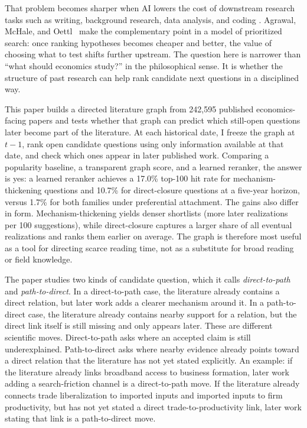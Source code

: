 \documentclass[11pt]{article}
\begin{document}
That problem becomes sharper when AI lowers the cost of downstream research tasks such as writing, background research, data analysis, and coding \citep{korinek2024generative}. Agrawal, McHale, and Oettl~\citeyearpar{agrawal2024ai} make the complementary point in a model of prioritized search: once ranking hypotheses becomes cheaper and better, the value of choosing what to test shifts further upstream. The question here is narrower than ``what should economics study?'' in the philosophical sense. It is whether the structure of past research can help rank candidate next questions in a disciplined way.

This paper builds a directed literature graph from 242{,}595 published economics-facing papers and tests whether that graph can predict which still-open questions later become part of the literature. At each historical date, I freeze the graph at \(t-1\), rank open candidate questions using only information available at that date, and check which ones appear in later published work. Comparing a popularity baseline, a transparent graph score, and a learned reranker, the answer is yes: a learned reranker achieves a 17.0\% top-100 hit rate for mechanism-thickening questions and 10.7\% for direct-closure questions at a five-year horizon, versus 1.7\% for both families under preferential attachment. The gains also differ in form. Mechanism-thickening yields denser shortlists (more later realizations per 100 suggestions), while direct-closure captures a larger share of all eventual realizations and ranks them earlier on average. The graph is therefore most useful as a tool for directing scarce reading time, not as a substitute for broad reading or field knowledge.

The paper studies two kinds of candidate question, which it calls \emph{direct-to-path} and \emph{path-to-direct}. In a direct-to-path case, the literature already contains a direct relation, but later work adds a clearer mechanism around it. In a path-to-direct case, the literature already contains nearby support for a relation, but the direct link itself is still missing and only appears later. These are different scientific moves. Direct-to-path asks where an accepted claim is still underexplained. Path-to-direct asks where nearby evidence already points toward a direct relation that the literature has not yet stated explicitly. An example: if the literature already links broadband access to business formation, later work adding a search-friction channel is a direct-to-path move. If the literature already connects trade liberalization to imported inputs and imported inputs to firm productivity, but has not yet stated a direct trade-to-productivity link, later work stating that link is a path-to-direct move.
\end{document}

